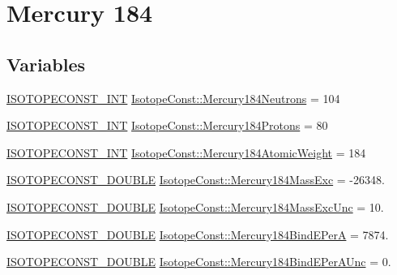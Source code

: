 \hypertarget{group___isotope_const-_mercury-_hg184}{}\section{Mercury 184}
\label{group___isotope_const-_mercury-_hg184}
\subsection*{Variables}
\begin{DoxyCompactItemize}
\item 
\mbox{\hyperlink{group___isotope_const-_macros_ga5f18360b3e99483a35c32d789e62621c}{I\+S\+O\+T\+O\+P\+E\+C\+O\+N\+S\+T\+\_\+\+I\+NT}} \mbox{\hyperlink{group___isotope_const-_mercury-_hg184_ga1844027f232592428d2eaae986d2071f}{Isotope\+Const\+::\+Mercury184\+Neutrons}} = 104
\item 
\mbox{\hyperlink{group___isotope_const-_macros_ga5f18360b3e99483a35c32d789e62621c}{I\+S\+O\+T\+O\+P\+E\+C\+O\+N\+S\+T\+\_\+\+I\+NT}} \mbox{\hyperlink{group___isotope_const-_mercury-_hg184_ga4a623967d28d9d81a230a5ed5b1d9223}{Isotope\+Const\+::\+Mercury184\+Protons}} = 80
\item 
\mbox{\hyperlink{group___isotope_const-_macros_ga5f18360b3e99483a35c32d789e62621c}{I\+S\+O\+T\+O\+P\+E\+C\+O\+N\+S\+T\+\_\+\+I\+NT}} \mbox{\hyperlink{group___isotope_const-_mercury-_hg184_ga0e2c49741f742ae0bdb5a12f170e2838}{Isotope\+Const\+::\+Mercury184\+Atomic\+Weight}} = 184
\item 
\mbox{\hyperlink{group___isotope_const-_macros_ga8f45a7272ce02c0b4c65c44636ed719a}{I\+S\+O\+T\+O\+P\+E\+C\+O\+N\+S\+T\+\_\+\+D\+O\+U\+B\+LE}} \mbox{\hyperlink{group___isotope_const-_mercury-_hg184_ga561d14c3abaf268b6a220147edfbf623}{Isotope\+Const\+::\+Mercury184\+Mass\+Exc}} = -\/26348.
\item 
\mbox{\hyperlink{group___isotope_const-_macros_ga8f45a7272ce02c0b4c65c44636ed719a}{I\+S\+O\+T\+O\+P\+E\+C\+O\+N\+S\+T\+\_\+\+D\+O\+U\+B\+LE}} \mbox{\hyperlink{group___isotope_const-_mercury-_hg184_gaeed432695cd1e9d3c297658a707e0218}{Isotope\+Const\+::\+Mercury184\+Mass\+Exc\+Unc}} = 10.
\item 
\mbox{\hyperlink{group___isotope_const-_macros_ga8f45a7272ce02c0b4c65c44636ed719a}{I\+S\+O\+T\+O\+P\+E\+C\+O\+N\+S\+T\+\_\+\+D\+O\+U\+B\+LE}} \mbox{\hyperlink{group___isotope_const-_mercury-_hg184_ga19d001fbed688f29ca347830547522c0}{Isotope\+Const\+::\+Mercury184\+Bind\+E\+PerA}} = 7874.
\item 
\mbox{\hyperlink{group___isotope_const-_macros_ga8f45a7272ce02c0b4c65c44636ed719a}{I\+S\+O\+T\+O\+P\+E\+C\+O\+N\+S\+T\+\_\+\+D\+O\+U\+B\+LE}} \mbox{\hyperlink{group___isotope_const-_mercury-_hg184_gaf8319b2fa178d786331d8aec2eafc477}{Isotope\+Const\+::\+Mercury184\+Bind\+E\+Per\+A\+Unc}} = 0.

\end{DoxyCompactItemize}

